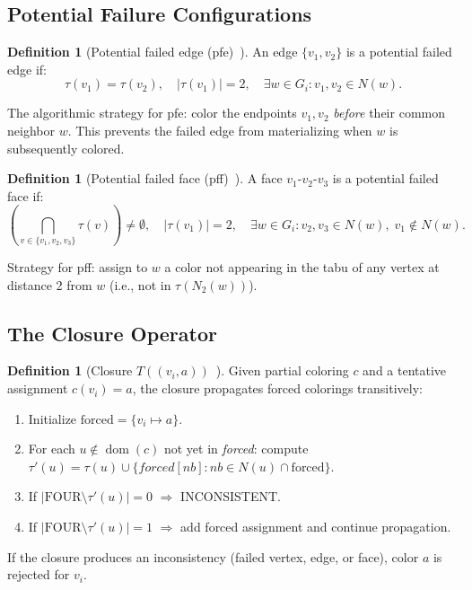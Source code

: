 \documentclass[12pt,letterpaper]{article}
\theoremstyle{plain}
\theoremstyle{definition}
\newtheorem{definition}[theorem]{Definition}
\theoremstyle{remark}
\newcommand{\dom}{\operatorname{dom}}
\begin{document}
\subsection{Potential Failure Configurations}

\begin{definition}[Potential failed edge (pfe)~\cite{deita2024}]
An edge $\{v_1, v_2\}$ is a potential failed edge if:
\[
    \tau(v_1) = \tau(v_2),\quad |\tau(v_1)| = 2,\quad
    \exists w \in G_i : v_1, v_2 \in N(w).
\]
\end{definition}

The algorithmic strategy for pfe: color the endpoints $v_1, v_2$
\emph{before} their common neighbor $w$. This prevents the failed edge from
materializing when $w$ is subsequently colored.

\begin{definition}[Potential failed face (pff)~\cite{deita2024}]
A face $v_1$-$v_2$-$v_3$ is a potential failed face if:
\[
    \left(\bigcap_{v \in \{v_1,v_2,v_3\}} \tau(v)\right) \neq \emptyset,\quad
    |\tau(v_1)| = 2,\quad
    \exists w \in G_i : v_2, v_3 \in N(w),\; v_1 \notin N(w).
\]
\end{definition}

Strategy for pff: assign to $w$ a color not appearing in the tabu of any
vertex at distance 2 from $w$ (i.e., not in $\tau(N_2(w))$).

\subsection{The Closure Operator}

\begin{definition}[Closure $T((v_i, a))$~\cite{deita2024}]
Given partial coloring $c$ and a tentative assignment $c(v_i) = a$, the
closure propagates forced colorings transitively:
\begin{enumerate}[noitemsep]
    \item Initialize $\text{forced} = \{v_i \mapsto a\}$.
    \item For each $u \notin \dom(c)$ not yet in \emph{forced}: compute
        $\tau'(u) = \tau(u) \cup \{forced[nb] : nb \in N(u) \cap \text{forced}\}$.
    \item If $|\text{FOUR} \setminus \tau'(u)| = 0$ $\Rightarrow$ INCONSISTENT.
    \item If $|\text{FOUR} \setminus \tau'(u)| = 1$ $\Rightarrow$ add forced assignment
        and continue propagation.
\end{enumerate}
If the closure produces an inconsistency (failed vertex, edge, or face),
color $a$ is rejected for $v_i$.
\end{definition}
\end{document}
